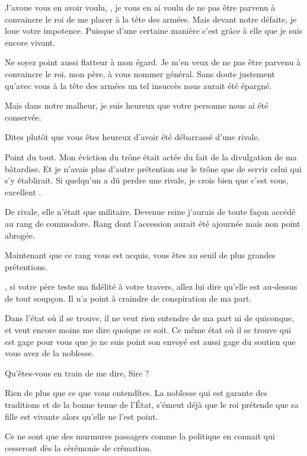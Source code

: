 \begin{drama}
  \generalspeaks J’avoue vous en avoir voulu, \elena, je vous en ai voulu de ne pas être parvenu à convaincre le roi de me placer à la tête des armées. Mais devant notre défaite, je loue votre impotence. Puisque d’une certaine manière c’est grâce à elle que je suis encore vivant.

  \elenaspeaks Ne soyez point aussi flatteur à mon égard. Je m’en veux de ne pas être parvenu à convaincre le roi, mon père, à vous nommer général. Sans doute justement qu’avec vous à la tête des armées un tel insuccès nous aurait été épargné.

  Mais dans notre malheur, je suis heureux que votre personne nous ai été conservée.

  \generalspeaks Dites plutôt que vous êtes heureux d’avoir été débarrassé d’une rivale.

  \elenaspeaks Point du tout. Mon éviction du trône était actée du fait de la divulgation de ma bâtardise. Et je n’avais plus d’autre prétention sur le trône que de  servir celui qui s’y établirait. Si quelqu’un a dû perdre une rivale, je crois bien que c’est vous, excellent \general.

  \generalspeaks De rivale, elle n’était que militaire. Devenue reine j’aurais de toute façon accédé au rang de commodore. Rang dont l’accession aurait été ajournée mais non point abrogée.

  \elenaspeaks Maintenant que ce rang vous est acquis, vous êtes au seuil de plus grandes prétentions.

  \generalspeaks \elena{}, si votre père teste ma fidélité à votre travers, allez lui dire qu’elle est au-dessus de tout soupçon. Il n’a point à craindre de conspiration de ma part.

  \elenaspeaks Dans l’état où il se trouve, il ne veut rien entendre de ma part ni de quiconque, et veut encore moins me dire quoique ce soit. Ce même état où il se trouve qui est gage pour vous que je ne suis point son envoyé est aussi gage du soutien que vous avez de la noblesse.

  \generalspeaks Qu’êtes-vous en train de me dire, Sire ?

  \elenaspeaks Rien de plus que ce que vous entendîtes. La noblesse qui est garante des traditions et de la bonne tenue de l’État, s’émeut déjà que le roi prétende que sa fille est vivante alors qu’elle ne l’est point.

  \generalspeaks Ce ne sont que des murmures passagers comme la politique en connait qui cesseront dès la cérémonie de crémation.


\end{drama}
